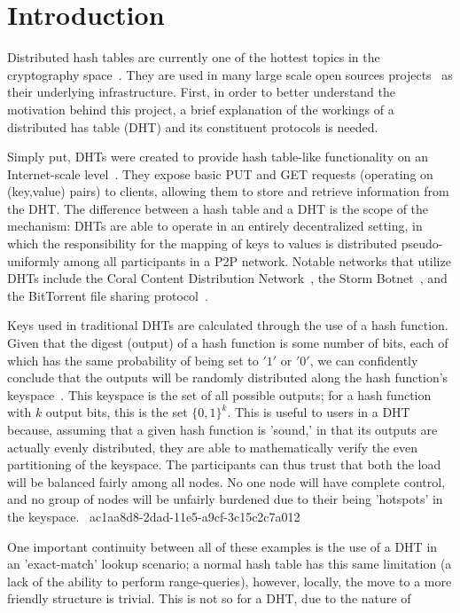 \documentclass[12pt]{article}
\begin{document}
\section{Introduction}
\par Distributed hash tables are currently one of the hottest topics in the cryptography space~\cite{Stoica:2001dj,Rowstron:2001ea,Ratnasamy:2001wn}. They are used in many large scale open sources projects~\cite{Freitas:2013tb,Xu:2010vs,Perfitt:2010fh} as their underlying infrastructure. First, in order to better understand the motivation behind this project, a brief explanation of the workings of a distributed has table (DHT) and its constituent protocols is needed.

\par Simply put, DHTs were created to provide hash table-like functionality on an Internet-scale level~\cite{Ratnasamy:2001wn}. They expose basic PUT and GET requests (operating on (key,value) pairs) to clients, allowing them to store and retrieve information from the DHT. The difference between a hash table and a DHT is the scope of the mechanism: DHTs are able to operate in an entirely decentralized setting, in which the responsibility for the mapping of keys to values is distributed pseudo-uniformly among all participants in a P2P network. Notable networks that utilize DHTs include the Coral Content Distribution Network~\cite{Freedman:2004vb}, the Storm Botnet~\cite{Holz:2008uk}, and the BitTorrent file sharing protocol~\cite{Cohen:y1_8mBnw}.

\par Keys used in traditional DHTs are calculated through the use of a hash function. Given that the digest (output) of a hash function is some number of bits, each of which has the same probability of being set to $'1'$ or $'0'$, we can confidently conclude that the outputs will be randomly distributed along the hash function's keyspace~. This keyspace is the set of all possible outputs; for a hash function with $k$ output bits, this is the set $\{0,1\}^k$. This is useful to users in a DHT because, assuming that a given hash function is 'sound,' in that its outputs are actually evenly distributed, they are able to mathematically verify the even partitioning of the keyspace. The participants can thus trust that both the load will be balanced fairly among all nodes. No one node will have complete control, and no group of nodes will be unfairly burdened due to their being 'hotspots' in the keyspace.~
ac1aa8d8-2dad-11e5-a9cf-3c15c2c7a012
\par One important continuity between all of these examples is the use of a DHT in an 'exact-match' lookup scenario; a normal hash table has this same limitation (a lack of the ability to perform range-queries), however, locally, the move to a more friendly structure is trivial. This is not so for a DHT, due to the nature of
\printbibliography
\end{document}
